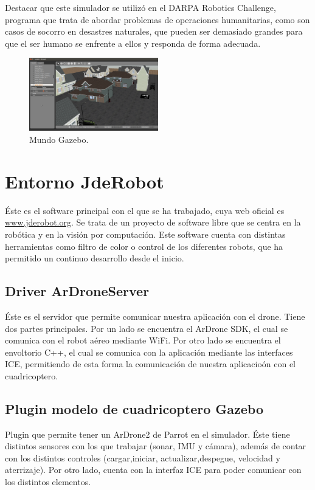 \hspace{1 cm} Destacar que este simulador se utiliz\'o en el DARPA Robotics Challenge, programa que trata de abordar problemas de operaciones humanitarias, como son casos de socorro en desastres naturales, que pueden ser demasiado grandes para que el ser humano se enfrente a ellos y responda de forma adecuada.

\begin{figure}[H]
	\centering
		\includegraphics[width=0.5\textwidth]{imgs/gazeboworld.png}
				\caption{Mundo Gazebo.}
	\label{fig:MundoGazebo}
\end{figure}

\section{Entorno JdeRobot}
\hspace{1 cm} \'Este es el software principal con el que se ha trabajado, cuya web oficial es \underline{\url{www.jderobot.org}}. Se trata de un proyecto de software libre que se centra en la rob\'otica y en la visi\'on por computaci\'on. Este software cuenta con distintas herramientas como filtro de color o control de los diferentes robots, que ha permitido un continuo desarrollo desde el inicio. 


\subsection{Driver ArDroneServer}
\hspace{1 cm} \'Este es el servidor que permite comunicar nuestra aplicaci\'on con el drone. Tiene dos partes principales. Por un lado se encuentra el ArDrone SDK, el cual se comunica con el robot a\'ereo mediante WiFi. Por otro lado se encuentra el envoltorio C++, el cual se comunica con la aplicaci\'on mediante las interfaces ICE, permitiendo de esta forma la comunicaci\'on de nuestra aplicacio\'on con el cuadricoptero. 

\subsection{Plugin modelo de cuadricoptero Gazebo}
\hspace{1 cm} Plugin que permite tener un ArDrone2 de Parrot en el simulador. \'Este tiene distintos sensores con los que trabajar (sonar, IMU y c\'amara), adem\'as de contar con los distintos controles (cargar,iniciar, actualizar,despegue, velocidad y aterrizaje). Por otro lado, cuenta con la interfaz ICE para poder comunicar con los distintos elementos. 




